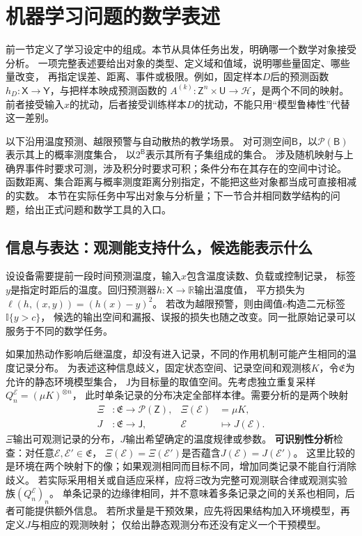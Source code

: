\FloatBarrier
\section{机器学习问题的数学表述}
\label{sec:future-learning-question-inventory}

前一节定义了学习设定中的组成。本节从具体任务出发，明确哪一个数学对象接受分析。
一项完整表述要给出对象的类型、定义域和值域，说明哪些量固定、哪些量改变，
再指定误差、距离、事件或极限。例如，固定样本$D$后的预测函数
$h_D:\mathsf X\to\mathsf Y$，与把样本映成预测函数的
$A^{(k)}:\mathsf Z^n\times\mathsf U\to\mathcal H$，是两个不同的映射。
前者接受输入$x$的扰动，后者接受训练样本$D$的扰动，不能只用“模型鲁棒性”代替这一差别。

以下沿用温度预测、越限预警与自动散热的教学场景。
对可测空间$\mathsf B$，以$\mathcal P(\mathsf B)$表示其上的概率测度集合，
以$2^{\mathsf B}$表示其所有子集组成的集合。
涉及随机映射与上确界事件时要求可测，涉及积分时要求可积；条件分布在其存在的空间中讨论。
函数距离、集合距离与概率测度距离分别指定，不能把这些对象都当成可直接相减的实数。
本节在实际任务中写出对象与分析量；下一节合并相同数学结构的问题，给出正式问题和数学工具的入口。

\subsection{信息与表达：观测能支持什么，候选能表示什么}
\label{sec:future-ml-information-expression}

设设备需要提前一段时间预测温度，输入$x$包含温度读数、负载或控制记录，
标签$y$是指定时距后的温度。回归预测器$h:\mathsf X\to\mathbb R$输出温度值，
平方损失为$\ell(h,(x,y))=(h(x)-y)^2$。
若改为越限预警，则由阈值$c$构造二元标签$\mathbb I\{y>c\}$，
候选的输出空间和漏报、误报的损失也随之改变。同一批原始记录可以服务于不同的数学任务。

如果加热动作影响后继温度，却没有进入记录，不同的作用机制可能产生相同的温度记录分布。
为表述这种信息歧义，固定状态空间、记录空间和观测核$K$，令$\mathfrak E$为允许的静态环境模型集合，
$\mathsf J$为目标量的取值空间。先考虑独立重复采样$Q_n^{\mathcal E}=(\mu K)^{\otimes n}$，
此时单条记录的分布决定全部样本律。需要分析的是两个映射
\begin{equation}
  \begin{aligned}
    \Xi&:\mathfrak E\to\mathcal P(\mathsf Z),
      &\Xi(\mathcal E)&=\mu K,\\
    J&:\mathfrak E\to\mathsf J,
      &\mathcal E&\mapsto J(\mathcal E).
  \end{aligned}
  \label{eq:future-task-observation-target-maps}
\end{equation}
$\Xi$输出可观测记录的分布，$J$输出希望确定的温度规律或参数。
\textbf{可识别性分析}检查：对任意$\mathcal E,\mathcal E'\in\mathfrak E$，
$\Xi(\mathcal E)=\Xi(\mathcal E')$是否蕴含$J(\mathcal E)=J(\mathcal E')$。
这里比较的是环境在两个映射下的像；如果观测相同而目标不同，增加同类记录不能自行消除歧义。
若实际采用相关或自适应采样，应将$\Xi$改为完整可观测联合律或观测实验族$(Q_n^{\mathcal E})_n$。
单条记录的边缘律相同，并不意味着多条记录之间的关系也相同，后者可能提供额外信息。
若所求量是干预效果，应先将因果结构加入环境模型，再定义$J$与相应的观测映射；
仅给出静态观测分布还没有定义一个干预模型。

